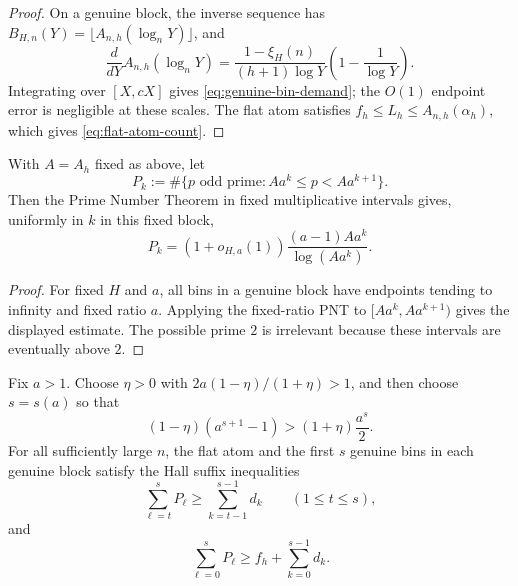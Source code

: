 \begin{proof}
On a genuine block, the inverse sequence has
$B_{H,n}(Y)=\lfloor A_{n,h}(\log_nY)\rfloor$, and
\[
  \frac{d}{dY}A_{n,h}(\log_nY)
  =
  \frac{1-\xi_H(n)}{(h+1)\log Y}
  \left(1-\frac1{\log Y}\right).
\]
Integrating over $[X,cX]$ gives \eqref{eq:genuine-bin-demand}; the $O(1)$
endpoint error is negligible at these scales.  The flat atom satisfies
$f_h\le L_h\le A_{n,h}(\alpha_h)$, which gives
\eqref{eq:flat-atom-count}.
\end{proof}

\begin{lemma}\label{lem:bin-prime-supply-estimate}
With $A=A_h$ fixed as above, let
\[
  P_k:=\#\{p\text{ odd prime}:Aa^k\le p<Aa^{k+1}\}.
\]
Then the Prime Number Theorem in fixed multiplicative intervals
\cite[Theorem~6]{HardyWright08} gives, uniformly in $k$ in this fixed block,
\[
  P_k=(1+o_{H,a}(1))\frac{(a-1)Aa^k}{\log(Aa^k)}.
  \tag{7.4}\label{eq:prime-bin-count}
\]
\end{lemma}

\begin{proof}
For fixed $H$ and $a$, all bins in a genuine block have endpoints tending to
infinity and fixed ratio $a$.  Applying the fixed-ratio PNT to
$[Aa^k,Aa^{k+1})$ gives the displayed estimate.  The possible prime $2$ is
irrelevant because these intervals are eventually above $2$.
\end{proof}

\begin{lemma}
\label{lem:interval-order-hall-suffix}
Fix $a>1$.  Choose $\eta>0$ with
$2a(1-\eta)/(1+\eta)>1$, and then choose $s=s(a)$ so that
\[
  (1-\eta)(a^{s+1}-1)>(1+\eta)\frac{a^s}{2}.
  \tag{7.5}\label{eq:queue-clear}
\]
For all sufficiently large $n$, the flat atom and the first $s$ genuine bins
in each genuine block satisfy the Hall suffix inequalities
\[
  \sum_{\ell=t}^{s}P_\ell \ge \sum_{k=t-1}^{s-1}d_k
  \qquad (1\le t\le s),
\]
and
\[
  \sum_{\ell=0}^{s}P_\ell
  \ge
  f_h+\sum_{k=0}^{s-1}d_k .
\]
\end{lemma}

